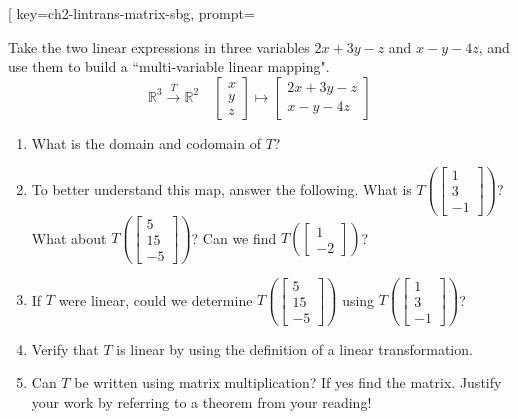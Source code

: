
\begin{SaveQuestion}[
        key=ch2-lintrans-matrix-sbg,
        prompt={Take the two linear expressions in three variables $2x + 3y -z$ and $ x-y-4z$, and use them to build a ``multi-variable linear mapping".
        $$ \mathbb{R}^3 \overset{T} \longrightarrow \mathbb{R}^2 \quad \begin{bmatrix} x \\ y \\ z \end{bmatrix} \mapsto \begin{bmatrix} 2x + 3y - z \\ x - y - 4z \end{bmatrix}$$
        \begin{enumerate} 
            \item What is the domain and codomain of $T$? 
            \item To better understand this map, answer the following. What is $T\left(\begin{bmatrix} 1\\3\\-1 \end{bmatrix}\right)$? What about $T\left(\begin{bmatrix} 5\\15\\-5 \end{bmatrix}\right)$? Can we find $T\left(\begin{bmatrix} 1\\-2 \end{bmatrix}\right)$? 
            \item If $T$ were linear, could we determine $T\left(\begin{bmatrix} 5\\15\\-5 \end{bmatrix}\right)$ using $T\left(\begin{bmatrix} 1 \\ 3 \\ -1 \end{bmatrix}\right)$?
            \item  Verify that $T$ is linear by using the definition of a linear transformation. 
            \item Can $T$ be written using matrix multiplication?  If yes find the matrix. Justify your work by referring to a theorem from your reading!  \end{enumerate}}

\end{SaveQuestion}
